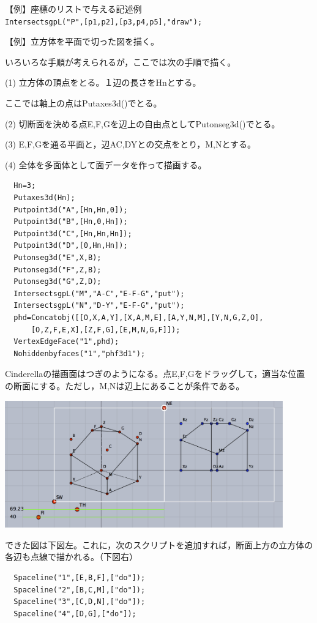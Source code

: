 \documentclass[papersize,a4paper,12pt,uplatex]{jsarticle}
\begin{document}
\begin{description}
\vspace{\baselineskip}
【例】座標のリストで与える記述例\\
  \verb|IntersectsgpL("P",[p1,p2],[p3,p4,p5],"draw");| 
  
\vspace{\baselineskip}
【例】立方体を平面で切った図を描く。

   いろいろな手順が考えられるが，ここでは次の手順で描く。
   
 (1) 立方体の頂点をとる。１辺の長さをHnとする。
 
    ここでは軸上の点はPutaxes3d()でとる。
    
(2) 切断面を決める点E,F,Gを辺上の自由点としてPutonseg3d()でとる。

(3) E,F,Gを通る平面と，辺AC,DYとの交点をとり，M,Nとする。

(4) 全体を多面体として面データを作って描画する。
\begin{verbatim}
  Hn=3;
  Putaxes3d(Hn);
  Putpoint3d("A",[Hn,Hn,0]);
  Putpoint3d("B",[Hn,0,Hn]);
  Putpoint3d("C",[Hn,Hn,Hn]);
  Putpoint3d("D",[0,Hn,Hn]);
  Putonseg3d("E",X,B); 
  Putonseg3d("F",Z,B); 
  Putonseg3d("G",Z,D); 
  IntersectsgpL("M","A-C","E-F-G","put"); 
  IntersectsgpL("N","D-Y","E-F-G","put"); 
  phd=Concatobj([[O,X,A,Y],[X,A,M,E],[A,Y,N,M],[Y,N,G,Z,O],
      [O,Z,F,E,X],[Z,F,G],[E,M,N,G,F]]);
  VertexEdgeFace("1",phd);
  Nohiddenbyfaces("1","phf3d1"); 
\end{verbatim}
Cinderellaの描画面はつぎのようになる。点E,F,Gをドラッグして，適当な位置の断面にする。ただし，M,Nは辺上にあることが条件である。

\vspace{\baselineskip}
\includegraphics[bb=0 0 713.04 327.02 , width=12cm]{Fig/IntersectsgpL0.pdf}


できた図は下図左。これに，次のスクリプトを追加すれば，断面上方の立方体の各辺も点線で描かれる。（下図右）
\begin{verbatim}
  Spaceline("1",[E,B,F],["do"]);
  Spaceline("2",[B,C,M],["do"]);
  Spaceline("3",[C,D,N],["do"]);
  Spaceline("4",[D,G],["do"]);
\end{verbatim}
\begin{center}      \end{center}


\end{description}
\end{document}
